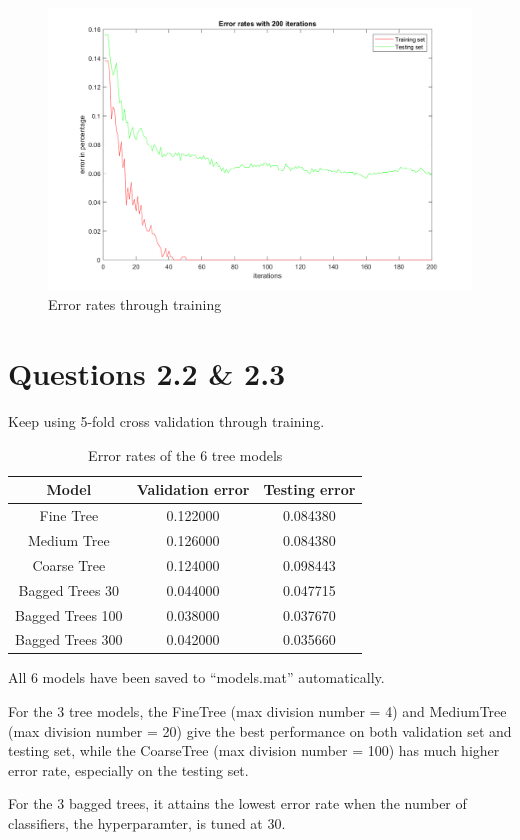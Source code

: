 \documentclass{article}
\begin{document}
{    \begin{figure}[H]
        \centering
        \includegraphics[width = 1\linewidth]{stump-AdaBoost/error.png}
        \caption{Error rates through training}
    \end{figure}
}

\section*{Questions 2.2 \& 2.3}
{
    Keep using 5-fold cross validation through training.

    \begin{table}[!hbp]
        \centering
        \begin{tabular}{|c|c|c|}
        \hline
        Model & Validation error & Testing error \\
        \hline
        Fine Tree  &  0.122000  &  0.084380 \\
        \hline
        Medium Tree  &   0.126000  & 0.084380 \\
        \hline
        Coarse Tree   &  0.124000  &  0.098443 \\
        \hline
        Bagged Trees 30   &    0.044000 &  0.047715 \\
        \hline
        Bagged Trees 100   &  0.038000  &  0.037670 \\
        \hline
        Bagged Trees 300   &   0.042000  & 0.035660 \\
        \hline
        \end{tabular}
        \caption{Error rates of the 6 tree models}
    \end{table}

    All 6 models have been saved to ``models.mat'' automatically. 

    For the 3 tree models, the FineTree (max division number = 4) and MediumTree (max division number = 20) give the best performance on both validation set and testing set, while the CoarseTree (max division number = 100) has much higher error rate, especially on the testing set.

    For the 3 bagged trees, it attains the lowest error rate when the number of classifiers, the hyperparamter, is tuned at 30.
}
\end{document}
